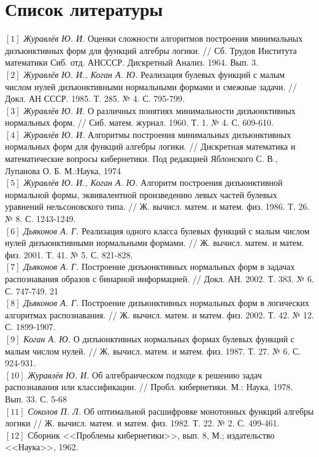 \documentclass[12pt,a4paper,oneside,fleqn,leqno]{article}
\theoremstyle{definition}
\begin{document}
\section*{Список литературы}
\noindent
$[1]$ {\it Журавлёв Ю. И.} Оценки сложности алгоритмов построения минимальных дизъюнктивных форм для функций алгебры логики. // Сб. Трудов Института математики Сиб. отд. АНСССР. Дискретный Анализ. 1964. Вып. 3.\\
$[2]$ {\it Журавлёв Ю. И., Коган А. Ю.} Реализация булевых функций с малым числом нулей дизъюнктивными нормальными формами и смежные задачи. // Докл. АН СССР. 1985. Т. 285. № 4. С. 795-799.\\
$[3]$ {\it Журавлёв Ю. И.} О различных понятиях минимальности дизъюнктивных нормальных форм. // Сиб. матем. журнал. 1960. Т. 1. № 4. С. 609-610.\\
$[4]$ {\it Журавлёв Ю. И.} Алгоритмы построения минимальных дизъюнктивных нормальных форм для функций алгебры логики. // Дискретная математика и математические вопросы кибернетики. Под редакцией Яблонского С. В., Лупанова О. Б. М.:Наука, 1974\\
$[5]$ {\it Журавлёв Ю. И., Коган А. Ю.} Алгоритм построения дизъюнктивной нормальной формы, эквивалентной произведению левых частей булевых уравнений нельсоновского типа. // Ж. вычисл. матем. и матем. физ. 1986. Т. 26. № 8. С. 1243-1249.\\
$[6]$ {\it Дьяконов А. Г.} Реализация одного класса булевых функций с малым числом нулей дизъюнктивными нормальными формами. // Ж. вычисл. матем. и матем. физ. 2001. Т. 41. № 5. С. 821-828.\\
$[7]$ {\it Дьяконов А. Г.} Построение дизъюнктивных нормальных форм в задачах распознавания образов с бинарной информацией. // Докл. АН. 2002. Т. 383. № 6. С. 747-749.
21\\
$[8]$ {\it Дьяконов А. Г.} Построение дизъюнктивных нормальных форм в логических алгоритмах распознавания. // Ж. вычисл. матем. и матем. физ. 2002. Т. 42. № 12. С. 1899-1907.\\
$[9]$ {\it Коган А. Ю.} О дизъюнктивных нормальных формах булевых функций с малым числом нулей. // Ж. вычисл. матем. и матем. физ. 1987. Т. 27. № 6. С. 924-931.\\
$[10]$ {\it Журавлёв Ю. И.} Об алгебраическом подходе к решению задач распознавания или классификации. // Пробл. кибернетики. М.: Наука, 1978. Вып. 33. С. 5-68\\
$[11]$ {\it Соколов П. Л.} Об оптимальной расшифровке монотонных функций алгебры логики // Ж. вычисл. матем. и матем. физ. 1982. Т. 22. № 2. С. 499-461.\\
$[12]$ Сборник <<Проблемы кибернетики>>, вып. 8, М.; издательство <<Наука>>, 1962.\\
\cite{voron_report}
\newpage
\end{document}
